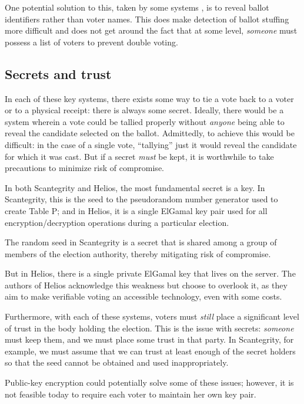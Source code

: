 \documentclass[10pt,twocolumn]{article}
\begin{document}
One potential solution to this, taken by some systems \cite{preta}, is to reveal ballot identifiers
rather than voter names. This does make detection of ballot stuffing more difficult and does not get
around the fact that at some level, \emph{someone} must possess a list of voters to prevent double
voting.

\subsection{Secrets and trust}

In each of these key systems, there exists some way to tie a vote back to a voter or to a physical
receipt: there is always some secret. Ideally, there would be a system wherein a vote could be
tallied properly without \emph{anyone} being able to reveal the candidate selected on the ballot.
Admittedly, to achieve this would be difficult: in the case of a single vote, ``tallying'' just it
would reveal the candidate for which it was cast. But if a secret \emph{must} be kept, it is
worthwhile to take precautions to minimize risk of compromise.

In both Scantegrity and Helios, the most fundamental secret is a key. In Scantegrity, this is the
seed to the pseudorandom number generator used to create Table P; and in Helios, it is a single
ElGamal key pair used for all encryption/decryption operations during a particular election.

The random seed in Scantegrity is a secret that is shared among a group of members of the election
authority, thereby mitigating risk of compromise.

But in Helios, there is a single private ElGamal key that lives on the server. The
authors of Helios acknowledge this weakness but choose to overlook it, as they aim to make
verifiable voting an accessible technology, even with some costs.

Furthermore, with each of these systems, voters must \emph{still} place a significant level of trust
in the body holding the election. This is the issue with secrets: \emph{someone} must keep them, and
we must place some trust in that party. In Scantegrity, for example, we must assume that we can
trust at least enough of the secret holders so that the seed cannot be obtained and used
inappropriately.

Public-key encryption could potentially solve some of these issues; however, it is not feasible
today to require each voter to maintain her own key pair.
\end{document}

